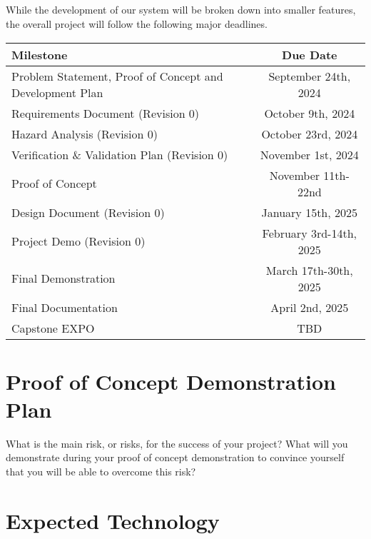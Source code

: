 \documentclass{article}
\begin{document}
\subsection*{\color{red}{Schedule}}
While the development of our system will be broken down into smaller features, the overall project will follow the following major deadlines.

\begin{center}
  \begin{tabularx}{\textwidth}{X|c}
    \textbf{Milestone} & \textbf{Due Date} \\
    \hline
    Problem Statement, Proof of Concept and Development Plan & September 24th, 2024 \\
    Requirements Document (Revision 0) & October 9th, 2024 \\
    Hazard Analysis (Revision 0) & October 23rd, 2024 \\
    Verification \& Validation Plan (Revision 0) & November 1st, 2024 \\
    Proof of Concept & November 11th-22nd \\
    Design Document (Revision 0) & January 15th, 2025 \\
    Project Demo (Revision 0) & February 3rd-14th, 2025 \\
    Final Demonstration & March 17th-30th, 2025 \\
    Final Documentation & April 2nd, 2025\\
    Capstone EXPO & TBD \\
  \end{tabularx}
\end{center}

\section{Proof of Concept Demonstration Plan}

What is the main risk, or risks, for the success of your project?  What will you
demonstrate during your proof of concept demonstration to convince yourself that
you will be able to overcome this risk?

\section{Expected Technology}

\end{document}
